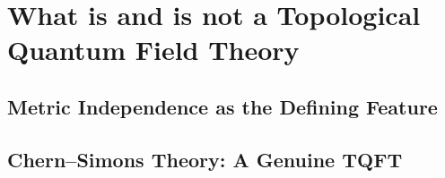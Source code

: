 %
%
%

\section{What is and is not a Topological Quantum Field Theory}


\subsection{Metric Independence as the Defining Feature}

%

\subsection{Chern--Simons Theory: A Genuine TQFT}

%

